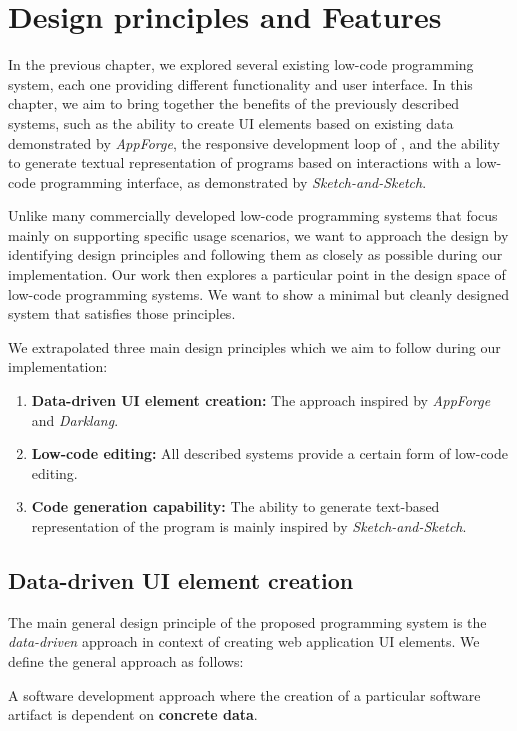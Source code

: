 \chapter{Design principles and Features}
\label{chap:design}

In the previous chapter, we explored several existing low-code programming system, each one providing different functionality and user interface.
In this chapter, we aim to bring together the benefits of the previously described systems,
such as the ability to create UI elements based on existing data demonstrated by \emph{AppForge}\cite{Yang_Gupta_Botev_Churchill_Levchenko_Shanmugasundaram_2008},
the responsive development loop of \citet{darklang}, and the ability to generate textual representation of programs based on
interactions with a low-code programming interface, as demonstrated by \emph{Sketch-and-Sketch}\cite{sketch-and-sketch}.

Unlike many commercially developed low-code programming systems that focus mainly on supporting specific usage scenarios,
we want to approach the design by identifying design principles and following them as closely as possible during our implementation.
Our work then explores a particular point in the design space of low-code programming systems.
We want to show a minimal but cleanly designed system that satisfies those principles.

We extrapolated three main design principles which we aim to follow during our implementation:
\begin{enumerate}
	\item \textbf{Data-driven UI element creation:} The approach inspired by \emph{AppForge} and \emph{Darklang}.
	\item \textbf{Low-code editing:}  All described systems provide a certain form of low-code editing.
	\item \textbf{Code generation capability:} The ability to generate text-based representation of the program is mainly inspired by \emph{Sketch-and-Sketch}.
\end{enumerate}

\section{Data-driven UI element creation}

The main general design principle of the proposed programming system is the \emph{data-driven} approach in context of creating web application UI elements.
We define the general approach as follows:
\begin{defn}
	A software development approach where the creation of a particular software artifact is dependent on \textbf{concrete data}.
\end{defn}

